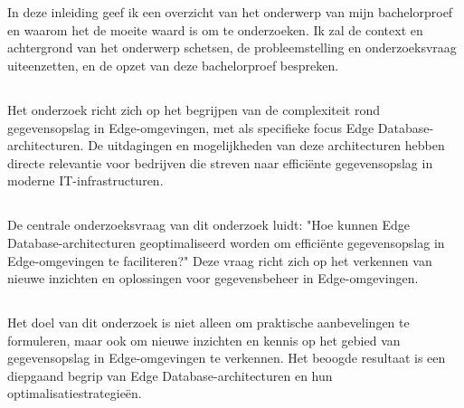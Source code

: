 \chapter{}%
\label{ch:inleiding}

In deze inleiding geef ik een overzicht van het onderwerp van mijn bachelorproef en waarom het de moeite waard is om te onderzoeken. Ik zal de context en achtergrond van het onderwerp schetsen, de probleemstelling en onderzoeksvraag uiteenzetten, en de opzet van deze bachelorproef bespreken.

\section{}%
\label{sec:probleemstelling}

Het onderzoek richt zich op het begrijpen van de complexiteit rond gegevensopslag in Edge-omgevingen, met als specifieke focus Edge Database-architecturen. De uitdagingen en mogelijkheden van deze architecturen hebben directe relevantie voor bedrijven die streven naar efficiënte gegevensopslag in moderne IT-infrastructuren.

\section{}%
\label{sec:onderzoeksvraag}

De centrale onderzoeksvraag van dit onderzoek luidt: "Hoe kunnen Edge Database-architecturen geoptimaliseerd worden om efficiënte gegevensopslag in Edge-omgevingen te faciliteren?" Deze vraag richt zich op het verkennen van nieuwe inzichten en oplossingen voor gegevensbeheer in Edge-omgevingen.

\section{}%
\label{sec:onderzoeksdoelstelling}

Het doel van dit onderzoek is niet alleen om praktische aanbevelingen te formuleren, maar ook om nieuwe inzichten en kennis op het gebied van gegevensopslag in Edge-omgevingen te verkennen. Het beoogde resultaat is een diepgaand begrip van Edge Database-architecturen en hun optimalisatiestrategieën.

\section{}%
\label{sec:opzet-bachelorproef}

